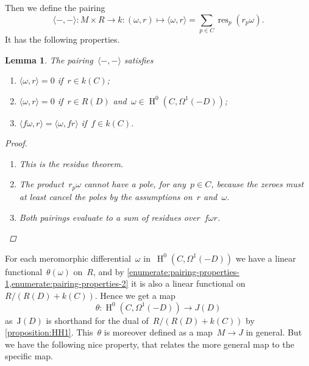 \documentclass[10pt,a4paper]{article}
\theoremstyle{lecture}
\newtheorem{lemma}[theorem]{Lemma}
\DeclareMathOperator\HH{H}
\DeclareMathOperator\res{res}
\begin{document}
Then we define the pairing
\begin{equation}
  \langle-,-\rangle\colon M\times R\to k:(\omega,r)\mapsto\langle\omega,r\rangle=\sum_{p\in C}\res_p(r_p\omega).
\end{equation}
It has the following properties.
\begin{lemma}
  \label{lemma:pairing-properties}
  The pairing~$\langle-,-\rangle$ satisfies
  \begin{enumerate}
    \item\label{enumerate:pairing-properties-1} $\langle\omega,r\rangle=0$ if~$r\in k(C)$;
    \item\label{enumerate:pairing-properties-2} $\langle\omega,r\rangle=0$ if~$r\in R(D)$ and~$\omega\in\HH^0(C,\Omega^1(-D))$;
    \item\label{enumerate:pairing-properties-3} $\langle f\omega,r\rangle=\langle\omega,fr\rangle$ if~$f\in k(C)$.
  \end{enumerate}

  \begin{proof}
    \begin{enumerate}
      \item This is the residue theorem.
      \item The product~$r_p\omega$ cannot have a pole, for any~$p\in C$, because the zeroes must at least cancel the poles by the assumptions on~$r$ and~$\omega$.
      \item Both pairings evaluate to a sum of residues over~$f\omega r$.
    \end{enumerate}
  \end{proof}
\end{lemma}
For each meromorphic differential~$\omega$ in~$\HH^0(C,\Omega^1(-D))$ we have a linear functional~$\theta(\omega)$ on~$R$, and by \cref{enumerate:pairing-properties-1,enumerate:pairing-properties-2} it is also a linear functional on~$R/(R(D)+k(C))$. Hence we get a map
\begin{equation}
  \theta\colon\HH^0(C,\Omega^1(-D))\to J(D)
\end{equation}
as~$\mathrm{J}(D)$ is shorthand for the dual of~$R/(R(D)+k(C))$ by \cref{proposition:HH1}. This~$\theta$ is moreover defined as a map~$M\to J$ in general. But we have the following nice property, that relates the more general map to the specific map.
\end{document}
